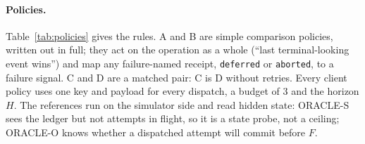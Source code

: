 \documentclass[11pt]{article}
\newcommand{\code}[1]{\texttt{#1}}
\begin{document}
\paragraph{Policies.} Table~\ref{tab:policies} gives the rules. A and B are simple comparison policies, written out in full; they act on the operation as a whole (``last terminal-looking event wins'') and map any failure-named receipt, \code{deferred} or \code{aborted}, to a failure signal. C and D are a matched pair: C is D without retries. Every client policy uses one key and payload for every dispatch, a budget of 3 and the horizon $H$. The references run on the simulator side and read hidden state: ORACLE-S sees the ledger but not attempts in flight, so it is a state probe, not a ceiling; ORACLE-O knows whether a dispatched attempt will commit before $F$.
\end{document}
